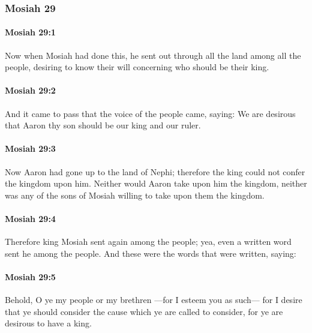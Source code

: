 	\subsubsection{Mosiah 29} %
		\label{MOSIAH-29}
		
		\paragraph{Mosiah 29:1} %
			\label{MOSIAH-29-1}

			Now when Mosiah had done this,
			he sent out through all the land among all the people,
			desiring to know their will concerning who should be their king.

		\paragraph{Mosiah 29:2} %
			\label{MOSIAH-29-2}

			And it came to pass that the voice of the people came, saying:
			We are desirous that Aaron thy son should be our king and our ruler.

		\paragraph{Mosiah 29:3} %
			\label{MOSIAH-29-3}

			Now Aaron had gone up to the land of Nephi;
			therefore the king could not confer the kingdom upon him.
			Neither would Aaron take upon him the kingdom,
			neither was any of the sons of Mosiah willing to take upon them the kingdom.

		\paragraph{Mosiah 29:4} %
			\label{MOSIAH-29-4}

			Therefore king Mosiah sent again among the people;
			yea, even a written word sent he among the people.
			And these were the words that were written, saying:

		\paragraph{Mosiah 29:5} %
			\label{MOSIAH-29-5}

			Behold, O ye my people or my brethren
			---for I esteem you as such---
			for I desire that ye should consider the cause which ye are called to consider,
			for ye are desirous to have a king.

